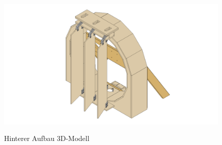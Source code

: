 \begin{figure}[H]
    \centering
    \includegraphics[width=1.1\textwidth]{../Inventor/hintererAufbau/png/hintererAufbau_hauptansicht.png}
    \label{fig:aufbau:haupt}
    \caption{Hinterer Aufbau 3D-Modell}
\end{figure}

